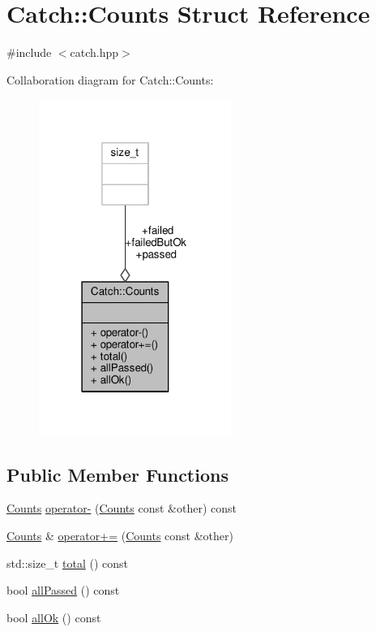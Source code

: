 \hypertarget{struct_catch_1_1_counts}{\section{Catch\-:\-:Counts Struct Reference}
\label{struct_catch_1_1_counts}
}


{\ttfamily \#include $<$catch.\-hpp$>$}



Collaboration diagram for Catch\-:\-:Counts\-:
\nopagebreak
\begin{figure}[H]
\begin{center}
\leavevmode
\includegraphics[width=178pt]{struct_catch_1_1_counts__coll__graph}
\end{center}
\end{figure}
\subsection*{Public Member Functions}
\begin{DoxyCompactItemize}
\item 
\hyperlink{struct_catch_1_1_counts}{Counts} \hyperlink{struct_catch_1_1_counts_aedf86fefe33938d132a6981171cd83e6}{operator-\/} (\hyperlink{struct_catch_1_1_counts}{Counts} const \&other) const 
\item 
\hyperlink{struct_catch_1_1_counts}{Counts} \& \hyperlink{struct_catch_1_1_counts_a322a89475cd2cc039140ef371e973677}{operator+=} (\hyperlink{struct_catch_1_1_counts}{Counts} const \&other)
\item 
std\-::size\-\_\-t \hyperlink{struct_catch_1_1_counts_a9125c662e30114e5c5cc94729b1e9e84}{total} () const 
\item 
bool \hyperlink{struct_catch_1_1_counts_adbbaca552f6017ce69e0d5dc5500bea4}{all\-Passed} () const 
\item 
bool \hyperlink{struct_catch_1_1_counts_ab2497c9dfc77be757a90225ea69595f5}{all\-Ok} () const 
\end{DoxyCompactItemize}

